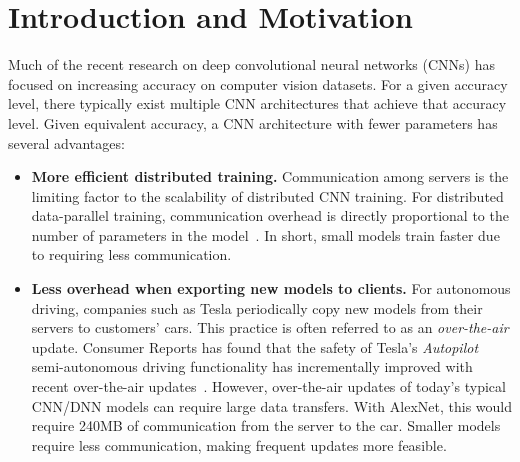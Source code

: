 \documentclass{article} %
\renewcommand{\cite}{\citep}
\def\vsp{\vspace{-0.15in}}
\begin{document}
\section{Introduction and Motivation}
\vsp
\label{sec:intro-ch5}
Much of the recent research on deep convolutional neural networks (CNNs) has focused on increasing accuracy on computer vision datasets.
For a given accuracy level, there typically exist multiple CNN architectures that achieve that accuracy level.
Given equivalent accuracy, a CNN architecture with fewer parameters has several advantages:
\begin{itemize}
	\setlength\itemsep{0in} %
	\item[$\bullet$]{{\bf More efficient distributed training.} 
		Communication among servers is the limiting factor to the scalability of distributed CNN training.
		For distributed data-parallel training, communication overhead is directly proportional to the number of parameters in the model~\cite{FireCaffe}.
		In short, small models train faster due to requiring less communication.
	}
	
	\item[$\bullet$]{{\bf Less overhead when exporting new models to clients.} For autonomous driving, companies such as Tesla periodically copy new models from their servers to customers' cars. This practice is often referred to as an {\em over-the-air} update. Consumer Reports has found that the safety of Tesla's {\em Autopilot} semi-autonomous driving functionality has incrementally improved with recent over-the-air updates~\cite{ConsumerReports-Tesla}. However, over-the-air updates of today's typical CNN/DNN models can require large data transfers. With AlexNet, this would require 240MB of communication from the server to the car. Smaller models require less communication, making frequent updates more feasible.}
	

\end{itemize}
\end{document}
